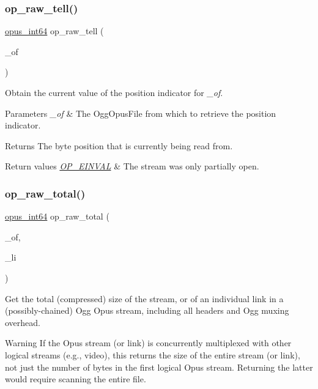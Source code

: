 \subsubsection{\texorpdfstring{op\_raw\_tell()}{op\_raw\_tell()}}
{\footnotesize\ttfamily \mbox{\hyperlink{opus__types_8h_ab6742070cf9d0ccffca2b80522b4f41a}{opus\+\_\+int64}} op\+\_\+raw\+\_\+tell (\begin{DoxyParamCaption}\item[{const Ogg\+Opus\+File $\ast$}]{\+\_\+of }\end{DoxyParamCaption})}

Obtain the current value of the position indicator for {\itshape \+\_\+of}. 
\begin{DoxyParams}{Parameters}
{\em \+\_\+of} & The {\ttfamily Ogg\+Opus\+File} from which to retrieve the position indicator. \\
\hline
\end{DoxyParams}
\begin{DoxyReturn}{Returns}
The byte position that is currently being read from. 
\end{DoxyReturn}

\begin{DoxyRetVals}{Return values}
{\em \mbox{\hyperlink{group__error__codes_gae0879acafe9cc0ab72462d291fdb6fb6}{O\+P\+\_\+\+E\+I\+N\+V\+AL}}} & The stream was only partially open. \\
\hline
\end{DoxyRetVals}
\mbox{\label{group__stream__info_gaa433bdeab96315d315269b60ba52b877}} 
\subsubsection{\texorpdfstring{op\_raw\_total()}{op\_raw\_total()}}
{\footnotesize\ttfamily \mbox{\hyperlink{opus__types_8h_ab6742070cf9d0ccffca2b80522b4f41a}{opus\+\_\+int64}} op\+\_\+raw\+\_\+total (\begin{DoxyParamCaption}\item[{const Ogg\+Opus\+File $\ast$}]{\+\_\+of,  }\item[{int}]{\+\_\+li }\end{DoxyParamCaption})}

Get the total (compressed) size of the stream, or of an individual link in a (possibly-\/chained) Ogg Opus stream, including all headers and Ogg muxing overhead. \begin{DoxyWarning}{Warning}
If the Opus stream (or link) is concurrently multiplexed with other logical streams (e.\+g., video), this returns the size of the entire stream (or link), not just the number of bytes in the first logical Opus stream. Returning the latter would require scanning the entire file. 
\end{DoxyWarning}

